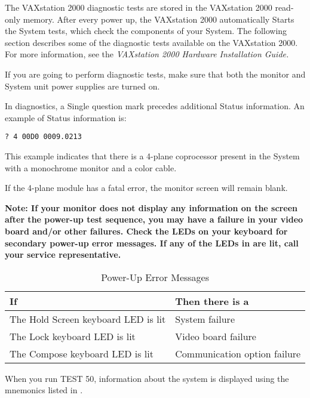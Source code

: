 \documentclass{dec}
\begin{document}
The VAXstation 2000 diagnostic tests are stored in the VAXstation 2000 read-
only memory. After every power up, the VAXstation 2000 automatically Starts
the System tests, which check the components of your System. The following
section describes some of the diagnostic tests available on the VAXstation
2000.
 For more information, see the \textit{VAXstation 2000 Hardware Installation
Guide.}

If you are going to perform diagnostic tests, make sure that both the monitor
and System unit power supplies are turned on.

In diagnostics, a Single question mark precedes additional Status information.
An example of Status information is:

{\tt ? 4 00D0  0009.0213}

This example indicates that there is a 4-plane coprocessor present in the
System with a monochrome monitor and a color cable.

If the 4-plane module has a fatal error, the monitor screen will remain blank.

\textbf{Note: If your monitor does not display any information on the screen after
the power-up test sequence, you may have a failure in your video board
and/or other failures.  Check the LEDs on your keyboard for secondary
power-up error messages. If any of the LEDs in  are lit, call your
service representative.}

\begin{table}[H]
\label{table:1}
\caption{Power-Up Error Messages}
\begin{tabularx}{\textwidth}{l l}
\hline
\textbf{If} & \textbf{Then there is a}\\
\hline
The Hold Screen keyboard LED is lit & System failure\\
The Lock keyboard LED is lit & Video board failure \\
The Compose keyboard LED is lit & Communication option failure\\
\hline
\end{tabularx}
\end{table}

When you run TEST 50, information about the system is displayed using the mnemonics listed in .
\end{document}
